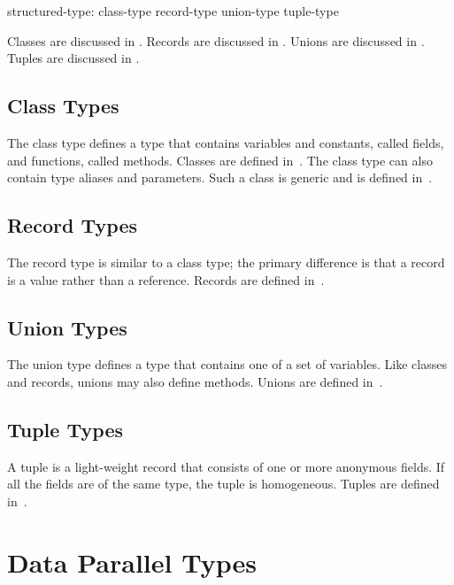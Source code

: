 \begin{syntax}
structured-type:
  class-type
  record-type
  union-type
  tuple-type
\end{syntax}

Classes are discussed in .  Records are discussed
in .  Unions are discussed in .  Tuples are
discussed in .

\subsection{Class Types}

The class type defines a type that contains variables and constants,
called fields, and functions, called methods.  Classes are defined
in~.  The class type can also contain type aliases and
parameters.  Such a class is generic and is defined
in~.

\subsection{Record Types}

The record type is similar to a class type; the primary difference is
that a record is a value rather than a reference.  Records are defined
in~.

\subsection{Union Types}

The union type defines a type that contains one of a set of variables.
Like classes and records, unions may also define methods.  Unions are
defined in~.

\subsection{Tuple Types}

A tuple is a light-weight record that consists of one or more
anonymous fields.  If all the fields are of the same type, the tuple
is homogeneous.  Tuples are defined in~.

\section{Data Parallel Types}
\label{Data_Parallel_Types}

